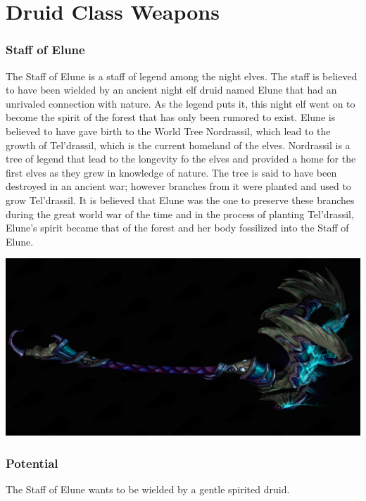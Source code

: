 \section{Druid Class Weapons}

\subsubsection{Staff of Elune}

The Staff of Elune is a staff of legend among the night elves. The staff is believed to have been wielded by an ancient night elf druid named Elune that had an unrivaled connection with nature. As the legend puts it, this night elf went on to become the spirit of the forest that has only been rumored to exist. Elune is believed to have gave birth to the World Tree Nordrassil, which lead to the growth of Tel'drassil, which is the current homeland of the elves. Nordrassil is a tree of legend that lead to the longevity fo the elves and provided a home for the first elves as they grew in knowledge of nature. The tree is said to have been destroyed in an ancient war; however branches from it were planted and used to grow Tel'drassil. It is believed that Elune was the one to preserve these branches during the great world war of the time and in the process of planting Tel'drassil, Elune's spirit became that of the forest and her body fossilized into the Staff of Elune. 

\begin{center}
	\includegraphics[width=\linewidth]{img/weapons/554329.jpg}
\end{center}

\subsubsection{Potential}

The Staff of Elune wants to be wielded by a gentle spirited druid. 

